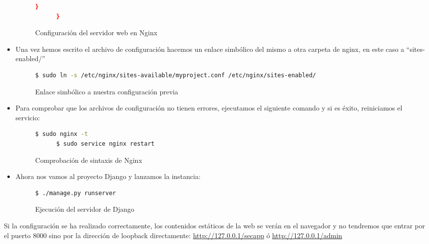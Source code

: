 \begin{itemize}
\begin{figure}[H]
\begin{lstlisting}[language=bash]
        }
      }
    \end{lstlisting}
    \caption{Configuración del servidor web en Nginx}
  \end{figure}
\item Una vez hemos escrito el archivo de configuración hacemos un enlace simbólico del mismo a otra carpeta de nginx, en este caso a ``sites-enabled/''
  \begin{figure}[H]
    \begin{lstlisting}[language=bash]
      $ sudo ln -s /etc/nginx/sites-available/myproject.conf /etc/nginx/sites-enabled/
    \end{lstlisting}
    \caption{Enlace simbólico a nuestra configuración previa}
  \end{figure}
\item Para comprobar que los archivos de configuración no tienen errores, ejecutamos el siguiente comando y si es éxito, reiniciamos el servicio:
  \begin{figure}[H]
    \begin{lstlisting}[language=bash]
      $ sudo nginx -t
      $ sudo service nginx restart
    \end{lstlisting}
    \caption{Comprobación de sintaxis de Nginx}
  \end{figure}
\item Ahora nos vamos al proyecto Django y lanzamos la instancia:
  \begin{figure}[H]
    \begin{lstlisting}[language=bash]
      $ ./manage.py runserver
    \end{lstlisting}
    \caption{Ejecución del servidor de Django}
  \end{figure}
\end{itemize}

Si la configuración se ha realizado correctamente, los contenidos estáticos de la web se verán en el navegador y no tendremos que entrar por el puerto 8000 sino por la dirección de loopback directamente: \href{http://127.0.0.1/secapp}{http://127.0.0.1/secapp} ó \href{http://127.0.0.1/admin}{http://127.0.0.1/admin}
